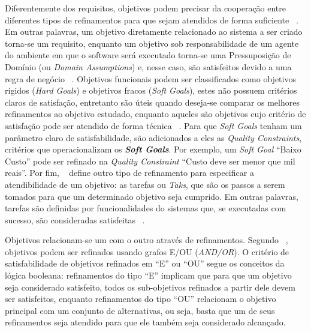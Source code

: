 Diferentemente dos requisitos, objetivos podem precisar da cooperação entre diferentes tipos de refinamentos para que sejam atendidos de forma suficiente ~\cite{dardenne1993goal}. Em outras palavras, um objetivo diretamente relacionado ao sistema a ser criado torna-se um requisito, enquanto um objetivo sob responsabilidade de um agente do ambiente em que o software será executado torna-se uma Pressuposição de Domínio (ou \textit{Domain Assumptions}) e, nesse caso, são satisfeitos devido a uma regra de negócio ~\cite{van2001goal, van1998managing}. Objetivos funcionais podem ser classificados como objetivos rígidos (\textit{Hard Goals}) e objetivos fracos (\textit{Soft Goals}), estes não possuem critérios claros de satisfação, entretanto são úteis quando deseja-se comparar os melhores refinamentos ao objetivo estudado, enquanto aqueles são objetivos cujo critério de satisfação pode ser atendido de forma técnica ~\cite{dardenne1993goal}. Para que \textit{Soft Goals} tenham um parâmetro claro de satisfabilidade, são adicionados a eles as \textit{Quality Constraints}, critérios que operacionalizam os \textit{\textbf{Soft Goals}}. Por exemplo, um \textit{Soft Goal} ``Baixo Custo'' pode ser refinado na \textit{Quality Constraint} ``Custo deve ser menor que mil reais''. Por fim, ~\cite{jureta2008revisiting} define outro tipo de refinamento para especificar a atendibilidade de um objetivo: as tarefas ou \textit{Taks}, que são os passos a serem tomados para que um determinado objetivo seja cumprido. Em outras palavras, tarefas são definidas por funcionalidades do sistemas que, se executadas com sucesso, são consideradas satisfeitas ~\cite{souza2012requirement}.

Objetivos relacionam-se um com o outro através de refinamentos. Segundo ~\cite{dardenne1991goal, dardenne1993goal}, objetivos podem ser refinados usando grafos E/OU (\textit{AND/OR}). O critério de satisfabilidade de objetivos refinados em ``E'' ou ``OU'' segue os conceitos da lógica booleana: refinamentos do tipo ``E'' implicam que para que um objetivo seja considerado satisfeito, todos os sub-objetivos refinados a partir dele devem ser satisfeitos, enquanto refinamentos do tipo ``OU'' relacionam o objetivo principal com um conjunto de alternativas, ou seja, basta que um de seus refinamentos seja atendido para que ele também seja considerado alcançado.


